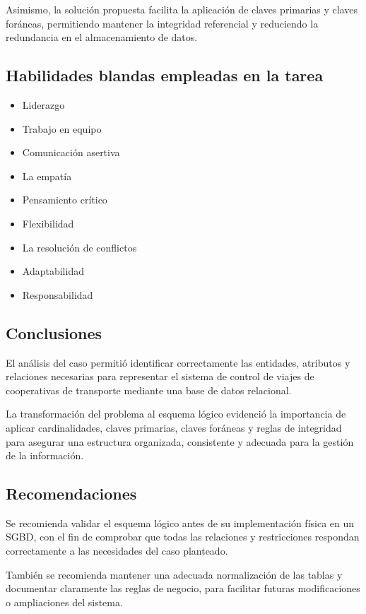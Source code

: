 \documentclass{article}
\begin{document}
Asimismo, la solución propuesta facilita la aplicación de claves primarias y claves foráneas, permitiendo mantener la integridad referencial y reduciendo la redundancia en el almacenamiento de datos.

\subsection{Habilidades blandas empleadas en la tarea}
\begin{itemize}
    \item[$\square$] Liderazgo
    \item[$\boxtimes$] Trabajo en equipo
    \item[$\boxtimes$] Comunicación asertiva
    \item[$\square$] La empatía
    \item[$\boxtimes$] Pensamiento crítico
    \item[$\square$] Flexibilidad
    \item[$\square$] La resolución de conflictos
    \item[$\boxtimes$] Adaptabilidad
    \item[$\boxtimes$] Responsabilidad
\end{itemize}

\subsection{Conclusiones}

El análisis del caso permitió identificar correctamente las entidades, atributos y relaciones necesarias para representar el sistema de control de viajes de cooperativas de transporte mediante una base de datos relacional.

La transformación del problema al esquema lógico evidenció la importancia de aplicar cardinalidades, claves primarias, claves foráneas y reglas de integridad para asegurar una estructura organizada, consistente y adecuada para la gestión de la información.

\subsection{Recomendaciones}

Se recomienda validar el esquema lógico antes de su implementación física en un SGBD, con el fin de comprobar que todas las relaciones y restricciones respondan correctamente a las necesidades del caso planteado.

También se recomienda mantener una adecuada normalización de las tablas y documentar claramente las reglas de negocio, para facilitar futuras modificaciones o ampliaciones del sistema.
\end{document}

